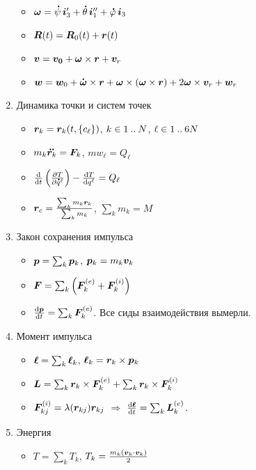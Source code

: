 \documentclass[draft,landscape,timbord]{notes}
\begin{document}
\begin{multicols*}{4}
\begin{enumerate}
    \begin{itemize}[$\triangleright$]
      \item $\v \omega = \dot\psi\,\v i_3'  + \dot\theta\,\v i_1''  + \dot\varphi\,\v i_3  $
      \item $\v R (t) = \v R_0  (t) + \v r(t)$
      \item $\v v = \v {v_0} + \v \omega \times \v r  + \v v_r $
      \item $\v w = \v w_0 + \dot{\v \omega} \times \v r 
        + \v \omega \times (\v \omega \times \v r) + 2 \v \omega \times \v v_r  + \v w_r $
    \end{itemize}
  \item Динамика точки и систем точек
    \begin{itemize}
      \item $\v r_k = \v r_k (t, \{c_\ell\})$, $k\in 1 \mathbin{..} N$, $\ell \in 1 \mathbin{..} 6N$
      \item $m_k \ddot{\v r_k} = \v F_k$, $m w_\ell= Q_\ell$
      \item $\fder{}{t} \left(\pder{T}{\dot q^\ell}\right) 
        - \fder{T}{q^\ell}  = Q_\ell$
      \item $\v r_c = \frac{\sum_k m_k \v r_k}{\sum_k m_k} $, $\sum_k m_k = M$
    \end{itemize}
  \item Закон сохранения импульса
    \begin{itemize}
      \item $\v p = \sum_k \v p_k$, $\v p_k = m_k \v v_k$
      \item $\v F = \sum_k \left( \v F_k^{(e)} + \v F_k^{(i)}\right)$
      \item $\fder{\v p}{t} = \sum_k \v F_k^{(e)}$. Все сиды взаимодействия вымерли.
    \end{itemize}
  \item  Момент импульса
    \begin{itemize}
      \item $\v \ell = \sum_k \v\ell_k $, $\v \ell_k = \v r_k \times \v p_k $
      \item $\v L = \sum_k \v r_k \times \v F_k^{(e)} + \sum_k \v r_k \times \v F_k^{(i)}  $
      \item $\v F_{kj}^{(i)} = \lambda (\v r_{kj}) \v r_{kj}$ $ \Rightarrow $ 
        $\fder{\v \ell}{t} = \sum_k \v L_k^{(e)}$.
    \end{itemize}
  \item Энергия
    \begin{itemize}
      \item $T = \sum_k T_k$, $T_k = \frac{m_k (\v v_k \cdot \v v_k)}{2}$

\end{itemize}
\end{enumerate}
\end{multicols*}
\end{document}
